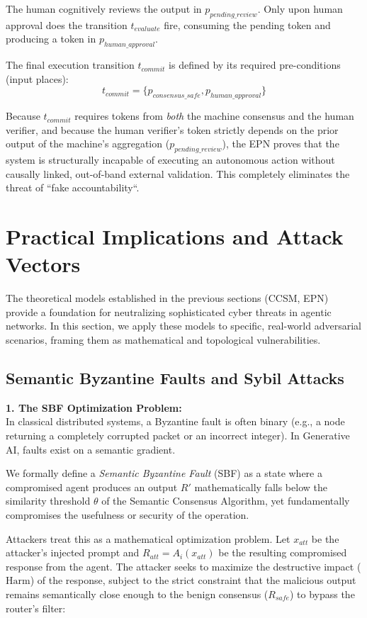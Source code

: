 \documentclass[a4paper,11pt,twocolumn]{article}
\theoremstyle{definition}
\theoremstyle{plain}
\begin{document}
The human cognitively reviews the output in $p_{pending\_review}$. Only upon human approval does the transition $t_{evaluate}$ fire, consuming the pending token and producing a token in $p_{human\_approval}$.

The final execution transition $t_{commit}$ is defined by its required pre-conditions (input places):
$$ t_{commit} = \{ p_{consensus\_safe}, p_{human\_approval} \} $$

Because $t_{commit}$ requires tokens from \textit{both} the machine consensus and the human verifier, and because the human verifier's token strictly depends on the prior output of the machine's aggregation ($p_{pending\_review}$), the EPN proves that the system is structurally incapable of executing an autonomous action without causally linked, out-of-band external validation. This completely eliminates the threat of “fake accountability“.

\section{Practical Implications and Attack Vectors}

The theoretical models established in the previous sections (CCSM, EPN) provide a foundation for neutralizing sophisticated cyber threats in agentic networks. In this section, we apply these models to specific, real-world adversarial scenarios, framing them as mathematical and topological vulnerabilities.

\subsection{Semantic Byzantine Faults and Sybil Attacks}

\textbf{1. The SBF Optimization Problem:}\\
In classical distributed systems, a Byzantine fault is often binary (e.g., a node returning a completely corrupted packet or an incorrect integer). In Generative AI, faults exist on a semantic gradient.

We formally define a \textit{Semantic Byzantine Fault} (SBF) as a state where a compromised agent produces an output $R'$ mathematically falls below the similarity threshold $\theta$ of the Semantic Consensus Algorithm, yet fundamentally compromises the usefulness or security of the operation.

Attackers treat this as a mathematical optimization problem. Let $x_{att}$ be the attacker's injected prompt and $R_{att} = A_i(x_{att})$ be the resulting compromised response from the agent. The attacker seeks to maximize the destructive impact ($\text{Harm}$) of the response, subject to the strict constraint that the malicious output remains semantically close enough to the benign consensus ($R_{safe}$) to bypass the router's filter:
\end{document}
